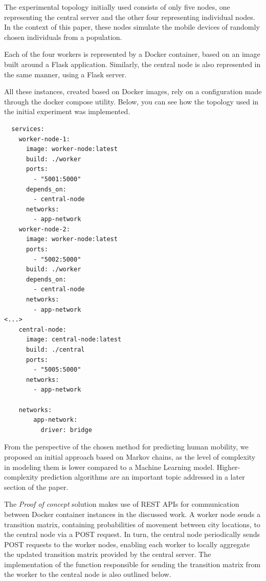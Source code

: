 \documentclass[conference]{IEEEtran}
\begin{document}
The experimental topology initially used consists of only five nodes, one representing the central server and the other four representing individual nodes. In the context of this paper, these nodes simulate the mobile devices of randomly chosen individuals from a population.

Each of the four workers is represented by a Docker container, based on an image built around a Flask application. Similarly, the central node is also represented in the same manner, using a Flask server.

All these instances, created based on Docker images, rely on a configuration made through the docker compose utility. Below, you can see how the topology used in the initial experiment was implemented.

\begin{lstlisting}
  services:
    worker-node-1:
      image: worker-node:latest
      build: ./worker
      ports:
        - "5001:5000"
      depends_on:
        - central-node
      networks:
        - app-network
    worker-node-2:
      image: worker-node:latest
      ports:
        - "5002:5000"
      build: ./worker
      depends_on:
        - central-node
      networks:
        - app-network
<...>
    central-node:
      image: central-node:latest
      build: ./central
      ports:
        - "5005:5000"
      networks:
        - app-network

    networks:
        app-network:
          driver: bridge
\end{lstlisting}

From the perspective of the chosen method for predicting human mobility, we proposed an initial approach based on Markov chains, as the level of complexity in modeling them is lower compared to a Machine Learning model. Higher-complexity prediction algorithms are an important topic addressed in a later section of the paper.

The \textit{Proof of concept} solution makes use of REST APIs for communication between Docker container instances in the discussed work. A worker node sends a transition matrix, containing probabilities of movement between city locations, to the central node via a POST request. In turn, the central node periodically sends POST requests to the worker nodes, enabling each worker to locally aggregate the updated transition matrix provided by the central server. The implementation of the function responsible for sending the transition matrix from the worker to the central node is also outlined below.
\end{document}
